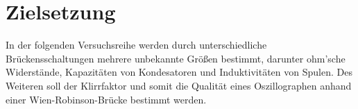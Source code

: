 \section{Zielsetzung}
\label{sec:Zielsetzung}
\nocite{V302}
In der folgenden Versuchsreihe werden durch unterschiedliche Brückensschaltungen mehrere unbekannte 
Größen bestimmt, darunter ohm'sche Widerstände, Kapazitäten von Kondesatoren und Induktivitäten 
von Spulen. Des Weiteren soll der Klirrfaktor und somit die Qualität eines Oszillographen anhand einer Wien-Robinson-Brücke 
bestimmt werden. 
